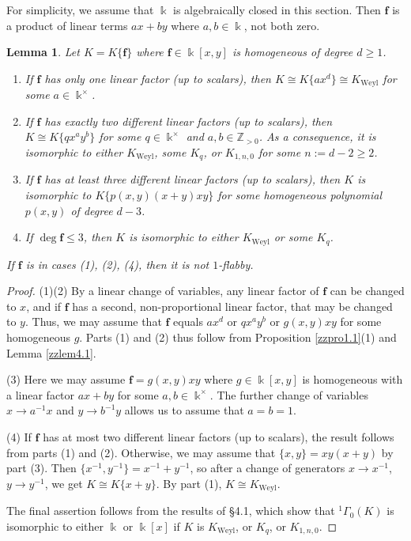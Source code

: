 \documentclass[12pt]{amsart}
\theoremstyle{plain}
\newtheorem{lemma}[theorem]{Lemma}
\numberwithin{theorem}{section}
\numberwithin{equation}{theorem}
\theoremstyle{definition}
\newcommand{\ZZ}{\mathbb{Z}}
\newcommand \bff {{\mathbf{f}}}
\newcommand \Zpos {\ZZ_{> 0}}
\DeclareMathOperator{\Weyl}{Weyl}
\newcommand \Kweyl {K_{\Weyl}}
\newcommand \kx {\Bbbk^\times}
\begin{document}
For simplicity, we assume that $\Bbbk$ is algebraically closed
in this section. Then $\bff$ is a product of linear 
terms $ax+by$ where $a,b \in \Bbbk$, not both zero.

\begin{lemma}
\label{zzlem6.1}
Let $K = K\{\bff\}$ where $\bff\in 
\Bbbk[x,y]$ is homogeneous of degree $d\geq 1$.
\begin{enumerate}
\item[(1)]
If $\bff$ has only one linear factor {\rm{(}}up to scalars{\rm{)}}, then 
$K\cong K\{a x^d\}\cong \Kweyl$ for some $a \in \kx$.
\item[(2)]
If $\bff$ has exactly two different linear factors {\rm{(}}up to scalars{\rm{)}}, then 
$K\cong K\{q x^a y^b\}$ for some $q \in \kx$ and $a,b \in \Zpos$. As a consequence, it is isomorphic 
to either $\Kweyl$, some $K_q$, or $K_{1,n,0}$ for some $n:=d-2\geq 2$.
\item[(3)]
If $\bff$ has at least three different linear factors {\rm{(}}up to scalars{\rm{)}}, 
then $K$ is isomorphic to $K\{p(x,y)(x+y)xy\}$
for some homogeneous polynomial $p(x,y)$ of degree $d-3$.
\item[(4)]
If $\deg \bff\leq 3$, then $K$ is isomorphic to either $\Kweyl$
or some $K_q$.
\end{enumerate}
If $\bff$ is in cases {\rm{(1), (2), (4)}}, then it is not $1$-flabby.
\end{lemma}

\begin{proof} 
(1)(2) By a linear change of variables, any linear factor of $\bff$ can be changed to $x$, and if $\bff$ has a second, non-proportional linear factor, that may be changed to $y$. Thus, we may assume that $\bff$ equals $ax^d$ or $qx^ay^b$ or $g(x,y)xy$ for some homogeneous $g$.  Parts (1) and (2) thus follow from Proposition \ref{zzpro1.1}(1) and Lemma \ref{zzlem4.1}.

(3) Here we may assume $\bff = g(x,y)xy$ where $g \in \Bbbk[x,y]$ is homogeneous with a linear factor $ax+by$ for some $a,b \in \kx$.  The further change of variables $x \rightarrow a^{-1}x$ and $y \rightarrow b^{-1}y$ allows us to assume that $a=b=1$.

(4) If $\bff$ has at most two different linear factors (up to scalars), the result follows from parts (1) and (2).  Otherwise, we may assume
that $\{x,y\}=xy(x+y)$ by part (3). Then 
$\{x^{-1},y^{-1}\}=x^{-1}+y^{-1}$, so after a change of generators
$x\to x^{-1}$, $y\to y^{-1}$, we get 
$K \cong K\{x+y\}$. By part (1), $K\cong \Kweyl$.

The final assertion follows from the results of \S4.1, which show that ${^1\Gamma}_0(K)$ 
is isomorphic to either $\Bbbk$ or $\Bbbk[x]$ if $K$ is 
$\Kweyl$, or $K_q$, or $K_{1,n,0}$. 
\end{proof}
\end{document}
